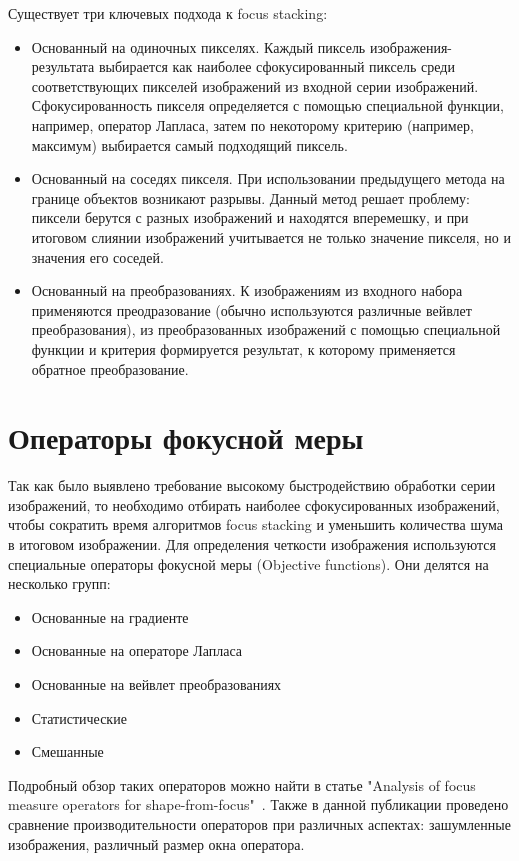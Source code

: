 \documentclass[14pt]{matmex-diploma-custom}
\begin{document}
Существует три ключевых подхода к focus stacking: 
\begin{itemize}
    \item Основанный на одиночных пикселях. Каждый пиксель изображения-результата выбирается как наиболее сфокусированный пиксель среди соответствующих пикселей изображений из входной серии изображений. Сфокусированность пикселя  определяется с помощью специальной функции, например, оператор Лапласа, затем по некоторому критерию (например, максимум) выбирается самый подходящий пиксель.
    \item Основанный на соседях пикселя. При использовании предыдущего метода на границе объектов возникают разрывы. Данный метод решает проблему: пиксели берутся с разных изображений и находятся вперемешку, и при итоговом слиянии изображений учитывается не только значение пикселя, но и значения его соседей.
    \item Основанный на преобразованиях. К изображениям из входного набора применяются преодразование (обычно используются различные вейвлет преобразования), из преобразованных изображений с помощью специальной функции и критерия формируется результат, к которому применяется обратное преобразование.
\end{itemize}

\section{Операторы фокусной меры}
Так как было выявлено требование высокому быстродействию обработки серии изображений, то необходимо отбирать наиболее сфокусированных изображений, чтобы сократить время алгоритмов focus stacking и уменьшить количества шума в итоговом изображении. Для определения четкости изображения используются специальные операторы фокусной меры (Objective functions). Они делятся на несколько групп:
\begin{itemize}
    \item Основанные на градиенте
    \item Основанные на операторе Лапласа
    \item Основанные на вейвлет преобразованиях
    \item Статистические
    \item Смешанные
\end{itemize}

Подробный обзор таких операторов можно найти в статье "Analysis of focus measure operators for shape-from-focus"~\cite{MeasureOperators}. Также в данной публикации проведено сравнение производительности операторов при различных аспектах: зашумленные изображения, различный размер окна оператора. 
\end{document}
